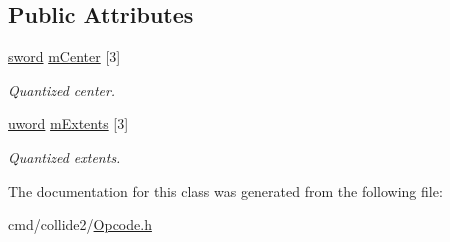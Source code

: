 \subsection*{Public Attributes}
\begin{DoxyCompactItemize}
\item 
\hyperlink{IceTypes_8h_a4f39f3859910e22cf5f7ab0307882e3f}{sword} \hyperlink{classOpcode_1_1QuantizedAABB_af60737d1d0b4fe0c08c2c9f6f4cecff2}{m\+Center} \mbox{[}3\mbox{]}\hypertarget{classOpcode_1_1QuantizedAABB_af60737d1d0b4fe0c08c2c9f6f4cecff2}{}\label{classOpcode_1_1QuantizedAABB_af60737d1d0b4fe0c08c2c9f6f4cecff2}

\begin{DoxyCompactList}\small\item\em Quantized center. \end{DoxyCompactList}\item 
\hyperlink{IceTypes_8h_a42fa576a6a3b73c1efc32ab91d176300}{uword} \hyperlink{classOpcode_1_1QuantizedAABB_a2db7fc3afe074cdff2c3501f5a394cc3}{m\+Extents} \mbox{[}3\mbox{]}\hypertarget{classOpcode_1_1QuantizedAABB_a2db7fc3afe074cdff2c3501f5a394cc3}{}\label{classOpcode_1_1QuantizedAABB_a2db7fc3afe074cdff2c3501f5a394cc3}

\begin{DoxyCompactList}\small\item\em Quantized extents. \end{DoxyCompactList}\end{DoxyCompactItemize}


The documentation for this class was generated from the following file\+:\begin{DoxyCompactItemize}
\item 
cmd/collide2/\hyperlink{Opcode_8h}{Opcode.\+h}\end{DoxyCompactItemize}

